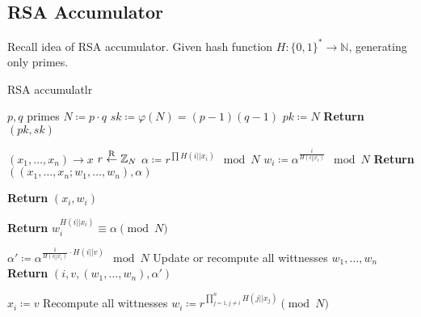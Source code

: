 \subsection{RSA Accumulator}

Recall idea of RSA accumulator. Given hash function $H : \{0, 1\}^* \rightarrow
\mathbb{N}$, generating only primes.

\begin{algorithm}
		\caption{RSA accumulatlr}

        \begin{algorithmic}[0]
                  \State $p, q$ primes
                  \State $N \coloneqq p \cdot q$
                  \State $sk \coloneqq \varphi(N) = (p - 1) (q - 1)$
                  \State $pk \coloneqq N$
                  \State \textbf{Return} $(pk, sk)$
                \EndProcedure

                  \State $(x_1, \ldots, x_n) \rightarrow x$ 
                  \State $r \overset{\mathrm{R}}{\gets} \mathbb{Z}_N$
                  \State $\alpha \coloneqq r^{\prod H(i || x_i)} \mod N$
                    \State $w_i \coloneqq \alpha^{\frac{i}{H(i || x_i)}} \mod N$ 
                  \EndFor
                  \State \textbf{Return} $((x_1, \ldots, x_n; w_1, \ldots, w_n), \alpha)$ 
                \EndProcedure

                 
                  \State \textbf{Return} $(x_i, w_i)$
                \EndProcedure

                  \State \textbf{Return} $w_i^{H(i || x_i)} \equiv \alpha \pmod{N}$
                \EndProcedure

                 
                  \State $\alpha' \coloneqq \alpha^{\frac{1}{H(i || x_i)} \cdot H(i || v)} \mod N$ 
                  \State Update or recompute all wittnesses $w_1, \ldots, w_n$
                  \State \textbf{Return} $(i, v, (w_1, \ldots, w_n), \alpha')$
                \EndProcedure

                  \State $x_i \coloneqq v$
                  \State Recompute all wittnesses
                    \State $w_i \coloneqq r^{\prod_{j=1, j \neq i}^n H(j || x_j)} \pmod{N}$ 
                  \EndFor
                \EndProcedure
        \end{algorithmic}
\end{algorithm}

